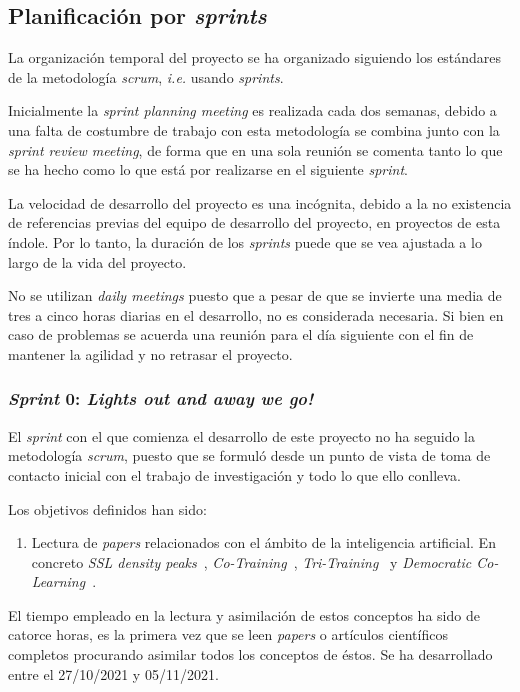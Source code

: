 \subsection{Planificación por \textit{sprints}}
La organización temporal del proyecto se ha organizado siguiendo los estándares de la metodología \textit{scrum}, \textit{i.e.} usando \textit{sprints}. 

Inicialmente la \textit{sprint planning meeting} es realizada cada dos semanas, debido a una falta de costumbre de trabajo con esta metodología se combina junto con la \textit{sprint review meeting}, de forma que en una sola reunión se comenta tanto lo que se ha hecho como lo que está por realizarse en el siguiente \textit{sprint}.

La velocidad de desarrollo del proyecto es una incógnita, debido a la no existencia de referencias previas del equipo de desarrollo del proyecto, en proyectos de esta índole. Por lo tanto, la duración de los \textit{sprints} puede que se vea ajustada a lo largo de la vida del proyecto.

No se utilizan \textit{daily meetings} puesto que a pesar de que se invierte una media de tres a cinco horas diarias en el desarrollo, no es considerada necesaria. Si bien en caso de problemas se acuerda una reunión para el día siguiente con el fin de mantener la agilidad y no retrasar el proyecto.

\subsubsection{\textit{Sprint} 0: \textit{Lights out and away we go!} }
El \textit{sprint} con el que comienza el desarrollo de este proyecto no ha seguido la metodología \textit{scrum}, puesto que se formuló desde un punto de vista de toma de contacto inicial con el trabajo de investigación y todo lo que ello conlleva.

Los objetivos definidos han sido:
\begin{enumerate}
\item Lectura de \textit{papers} relacionados con el ámbito de la inteligencia artificial. En concreto \textit{SSL density peaks}~\cite{wu2018self}, \textit{Co-Training}~\cite{blum1998combining}, \textit{Tri-Training}~\cite{zhou2005tri} y \textit{Democratic Co-Learning}~\cite{zhou2004democratic}.
\end{enumerate}

El tiempo empleado en la lectura y asimilación de estos conceptos ha sido de catorce horas, es la primera vez que se leen \textit{papers} o artículos científicos completos procurando asimilar todos los conceptos de éstos. Se ha desarrollado entre el 27/10/2021 y 05/11/2021.

